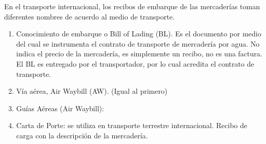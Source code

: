 En el transporte internacional,
los recibos de embarque de las mercaderías toman 
diferentes nombres de acuerdo al medio de transporte.
\begin{enumerate}
      \item Conocimiento de embarque o Bill of Lading (BL). Es el documento por 
      medio del cual se instrumenta el contrato de transporte de mercadería 
      por agua. No indica el precio de la mercadería, es simplemente un recibo,
      no es una factura. El BL es entregado por el transportador, por lo cual 
      acredita el contrato de transporte.
      \item Vía aérea, Air Waybill (AW). (Igual al primero)
      \item  Guías Aéreas (Air Waybill): 
      \item Carta de Porte: 
      se utiliza en transporte terrestre internacional. 
      Recibo de carga con la descripción de la mercadería.
\end{enumerate}